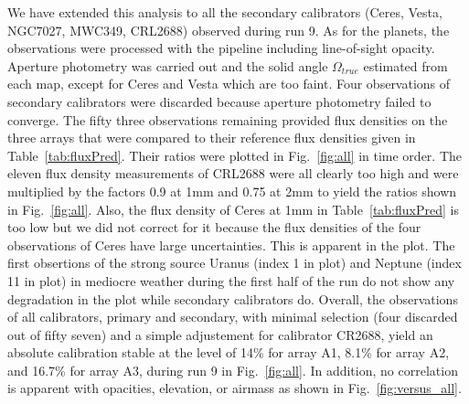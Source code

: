 We have extended this  analysis to all the secondary calibrators (Ceres, Vesta, NGC7027, MWC349, CRL2688)
observed during run 9. As for the planets, the observations were processed with the pipeline including line-of-sight opacity.
Aperture photometry was carried out and the solid angle $\Omega_{true}$  estimated from each map,
except for Ceres and Vesta which are too faint. Four observations of secondary calibrators were discarded because
aperture photometry failed to converge. The fifty three observations remaining provided flux densities on the three
arrays that were compared to their reference flux densities given in Table~\ref{tab:fluxPred}. Their  ratios
 were plotted in Fig.~\ref{fig:all} in time order.
The eleven flux density  measurements of CRL2688 were all clearly too high  and were multiplied
by the factors 0.9 at 1mm and 0.75 at 2mm to yield the ratios shown in Fig.~\ref{fig:all}. Also, the flux density of Ceres at 1mm
in Table~\ref{tab:fluxPred} is too low  but we did not correct for it because the flux densities of the four observations
of Ceres have large uncertainties. This is apparent in the plot. The first obsertions of the strong source
Uranus (index 1 in plot) and Neptune (index 11 in plot) in mediocre weather during the first half of the run
do not show any degradation in the plot while secondary calibrators do. Overall,  the observations of
all calibrators, primary and secondary, with minimal selection (four discarded out of fifty seven) and 
a simple adjustement for calibrator CR2688, yield an absolute calibration stable  at the level
of 14\% for array A1, 8.1\% for array A2, and 16.7\% for array A3, during run 9
in  Fig.~\ref{fig:all}. In addition, no correlation is apparent with opacities, elevation, or airmass
as shown in  Fig.~\ref{fig:versus_all}.



